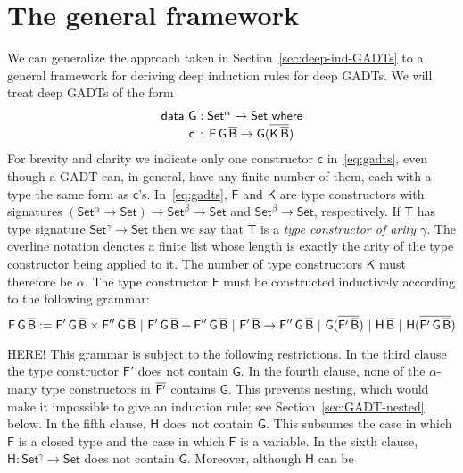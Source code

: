 \documentclass[9pt]{entcs}
\begin{document}
\section{The general framework}\label{sec:framework}

We can generalize the approach taken in
Section~\ref{sec:deep-ind-GADTs} to a general framework for deriving
deep induction rules for deep GADTs. We will treat deep GADTs of the
form 
\begin{equation}\label{eq:gadts}
\begin{array}{l}
  \mathsf{data\ G : Set^\alpha
    \to Set\ where}\\
\mathsf{\;\;\;\;\;\;\;\;c\, :\, F\,G\,\overline{B} \to G (\overline{K\,\overline{B}})}
\end{array}
\end{equation}
For brevity and clarity we indicate only one constructor $\mathsf{c}$
in~\eqref{eq:gadts}, even though a GADT can, in general, have any
finite number of them, each with a type the same form as
$\mathsf{c}$'s. In~\eqref{eq:gadts}, $\mathsf{F}$ and $\mathsf{K}$ are
type constructors with signatures $\mathsf{(Set^{\alpha} \to Set) \to
  Set^{\beta} \to Set}$ and $\mathsf{Set^{\beta} \to Set}$,
respectively. If $\mathsf{T}$ has type signature $\mathsf{Set^{\gamma}
  \to Set}$ then we say that $\mathsf{T}$ is a {\em type constructor
  of arity $\mathsf{\gamma}$}.  The overline notation denotes a finite
list whose length is exactly the arity of the type constructor being
applied to it. The number of type constructors $\mathsf{K}$ must
therefore be $\alpha$. The type constructor $\mathsf{F}$ must be
constructed inductively according to the following grammar:
\[\mathsf{F\,G\,\overline{B} :=
F'\,G\,\overline{B} \times F''\,G\,\overline{B}
\ \vert\ F'\,G\,\overline{B} + F''\,G\,\overline{B}
\ \vert\ F'\,\overline{B} \to F''\,G\,\overline{B}
\ \vert\ G(\overline{F'\,\overline{B}})
\ \vert\ H\,\overline{B}
\ \vert\ H (\overline{F'\,G\,\overline{B}})
}\]

{\color{red} HERE!}  This grammar is subject to the following
restrictions. In the third clause the type constructor $\mathsf{F'}$
does not contain $\mathsf{G}$. In the fourth clause, none of the
$\mathsf{\alpha}$-many type constructors in $\mathsf{\overline{F'}}$
contains $\mathsf{G}$.  This prevents nesting, which would make it
impossible to give an induction rule; see
Section~\ref{sec:GADT-nested} below. In the fifth clause, $\mathsf{H}$
does not contain $\mathsf{G}$. This subsumes the case in which
$\mathsf{F}$ is a closed type
{\color{red} and the case in which $\mathsf{F}$ is a variable.}  In
the sixth clause, $\mathsf{H : Set^\gamma \to Set}$ does not contain
$\mathsf{G}$.  Moreover, although $\mathsf{H}$ can be
\end{document}
